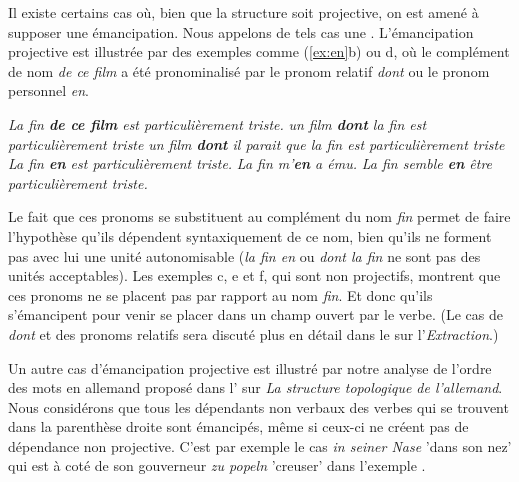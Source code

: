 {\label{sec:3.5.A}
Il existe certains cas où, bien que la structure soit projective, on est amené à supposer une émancipation. Nous appelons de tels cas une . L'émancipation projective est illustrée par des exemples comme (\ref{ex:en}b) ou d, où le complément de nom \textit{de ce film} a été pronominalisé par le pronom relatif \textit{dont} ou le pronom personnel \textit{en}.

\ea\label{ex:en}
\ea \textit{La fin \textbf{de ce film} est particulièrement triste.}
\ex \textit{un film \textbf{dont} la fin est particulièrement triste}
\ex \textit{un film \textbf{dont} il parait que la fin est particulièrement triste}
\ex \textit{La fin \textbf{en} est particulièrement triste.}
\ex \textit{La fin m'\textbf{en} a ému.}
\ex \textit{La fin semble \textbf{en} être particulièrement triste.}
\z\z

Le fait que ces pronoms se substituent au complément du nom \textit{fin} permet de faire l'hypothèse qu'ils dépendent syntaxiquement de ce nom, bien qu'ils ne forment pas avec lui une unité autonomisable (\textit{la fin en} ou \textit{dont la fin} ne sont pas des unités acceptables). Les exemples c, e et f, qui sont non projectifs, montrent que ces pronoms ne se placent pas par rapport au nom \textit{fin}. Et donc qu'ils s'émancipent pour venir se placer dans un champ ouvert par le verbe. (Le cas de \textit{dont} et des pronoms relatifs sera discuté plus en détail dans le  sur l'\textit{Extraction}.)

Un autre cas d'émancipation projective est illustré par notre analyse de l'ordre des mots en allemand proposé dans l' sur \textit{La structure topologique de l’allemand}. Nous considérons que tous les dépendants non verbaux des verbes qui se trouvent dans la parenthèse droite sont émancipés, même si ceux-ci ne créent pas de dépendance non projective. C'est par exemple le cas \textit{in seiner Nase} 'dans son nez' qui est à coté de son gouverneur \textit{zu popeln} 'creuser' dans l'exemple .
}

